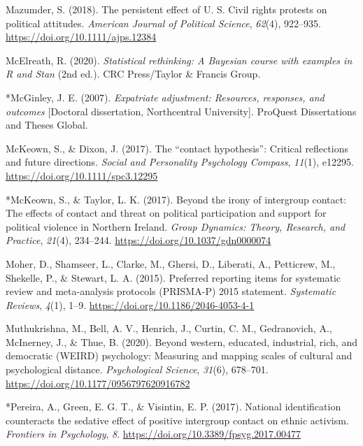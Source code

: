 \documentclass[12pt, letterpaper]{article}
\newenvironment{CSLReferences}[2]{}{}
\begin{document}
\begin{CSLReferences}{1}{0}
\leavevmode\hypertarget{ref-mazumder_persistent_2018}{}%
Mazumder, S. (2018). The persistent effect of {U. S.} Civil rights
protests on political attitudes. \emph{American Journal of Political
Science}, \emph{62}(4), 922--935.
\url{https://doi.org/10.1111/ajps.12384}

\leavevmode\hypertarget{ref-mcelreath_statistical_2020}{}%
McElreath, R. (2020). \emph{Statistical rethinking: A {Bayesian} course
with examples in {R} and {Stan}} (2nd ed.). CRC Press/Taylor \& Francis
Group.

\leavevmode\hypertarget{ref-1850}{}%
*McGinley, J. E. (2007). \emph{Expatriate adjustment: {Resources},
responses, and outcomes} {[}Doctoral dissertation, Northcentral
University{]}. {ProQuest Dissertations and Theses Global}.

\leavevmode\hypertarget{ref-mckeown_contact_2017}{}%
McKeown, S., \& Dixon, J. (2017). The {``contact hypothesis''}: Critical
reflections and future directions. \emph{Social and Personality
Psychology Compass}, \emph{11}(1), e12295.
\url{https://doi.org/10.1111/spc3.12295}

\leavevmode\hypertarget{ref-1376}{}%
*McKeown, S., \& Taylor, L. K. (2017). Beyond the irony of intergroup
contact: {The} effects of contact and threat on political participation
and support for political violence in {Northern} {Ireland}. \emph{Group
Dynamics: Theory, Research, and Practice}, \emph{21}(4), 234--244.
\url{https://doi.org/10.1037/gdn0000074}

\leavevmode\hypertarget{ref-moher_preferred_2015}{}%
Moher, D., Shamseer, L., Clarke, M., Ghersi, D., Liberati, A.,
Petticrew, M., Shekelle, P., \& Stewart, L. A. (2015). Preferred
reporting items for systematic review and meta-analysis protocols
({PRISMA}-{P}) 2015 statement. \emph{Systematic Reviews}, \emph{4}(1),
1--9. \url{https://doi.org/10.1186/2046-4053-4-1}

\leavevmode\hypertarget{ref-muthukrishna_beyond_2020}{}%
Muthukrishna, M., Bell, A. V., Henrich, J., Curtin, C. M., Gedranovich,
A., McInerney, J., \& Thue, B. (2020). Beyond western, educated,
industrial, rich, and democratic ({WEIRD}) psychology: Measuring and
mapping scales of cultural and psychological distance.
\emph{Psychological Science}, \emph{31}(6), 678--701.
\url{https://doi.org/10.1177/0956797620916782}

\leavevmode\hypertarget{ref-4004}{}%
*Pereira, A., Green, E. G. T., \& Visintin, E. P. (2017). National
identification counteracts the sedative effect of positive intergroup
contact on ethnic activism. \emph{Frontiers in Psychology}, \emph{8}.
\url{https://doi.org/10.3389/fpsyg.2017.00477}


\end{CSLReferences}
\end{document}
